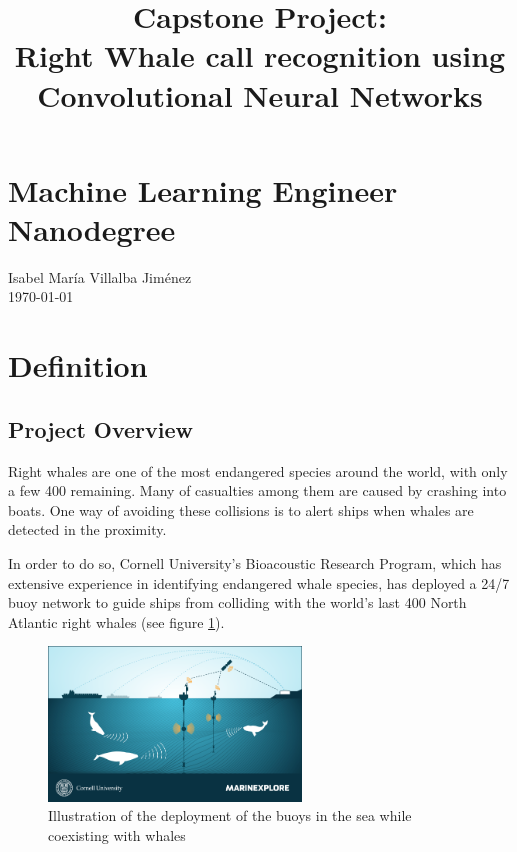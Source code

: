 \documentclass[]{article}
\author{}
\date{}
\title{Capstone Project: \\ Right Whale call recognition using \\ Convolutional Neural Networks}\label{capstone-project}
\begin{document}
\maketitle

\section*{Machine Learning Engineer Nanodegree}\label{machine-learning-engineer-nanodegree}

Isabel María Villalba Jiménez \\ \today

\section{Definition}\label{i.-definition}

\subsection{Project Overview}\label{project-overview}


Right whales are one of the most endangered species around the world, with only a few 400 remaining. Many of casualties among them are caused by crashing into boats. One way of avoiding these collisions is to alert ships when whales are detected in the proximity.

In order to do so, Cornell University's Bioacoustic Research Program, which has extensive experience in identifying endangered whale species, has deployed a 24/7 buoy network to guide ships from colliding with the world's last 400 North Atlantic right whales (see figure \ref{img:setup}).

\begin{figure}[htpb!]
\centering
\includegraphics[width= 0.6\textwidth]{images/kaggle_whale_detection_3}
\caption{Illustration of the deployment of the buoys in the sea while coexisting with whales \cite{kagglewhale} \label{img:setup}}
\end{figure}  
\end{document}
